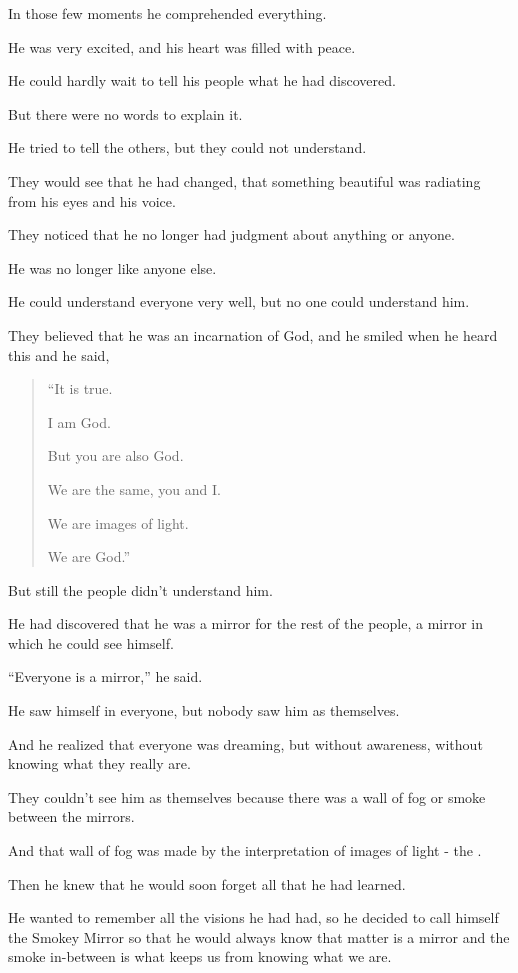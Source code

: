 \documentclass{article}
\numberwithin{equation}{section}
\begin{document}
%
In those few moments he comprehended everything.

He was very excited, and his heart was filled with peace.

He could hardly wait to tell his people what he had discovered.

But there were no words to explain it.

He tried to tell the others, but they could not understand.

They would see that he had changed, that something beautiful was radiating from his eyes and his voice.

They noticed that he no longer had judgment about anything or anyone.

He was no longer like anyone else.

%
He could understand everyone very well, but no one could understand him.

They believed that he was an incarnation of God, and he smiled when he heard this and he said,
\begin{quotation}
    ``It is true.
    
    I am God.
    
    But you are also God.
    
    We are the same, you and I.
    
    We are images of light.
    
    We are God.''
\end{quotation}
But still the people didn't understand him.

%
He had discovered that he was a mirror for the rest of the people, a mirror in which he could see himself.

``Everyone is a mirror,'' he said.

He saw himself in everyone, but nobody saw him as themselves.

And he realized that everyone was dreaming, but without awareness, without knowing what they really are.

They couldn't see him as themselves because there was a wall of fog or smoke between the mirrors.

And that wall of fog was made by the interpretation of images of light - the .

%
Then he knew that he would soon forget all that he had learned.

He wanted to remember all the visions he had had, so he decided to call himself the Smokey Mirror so that he would always know that matter is a mirror and the smoke in-between is what keeps us from knowing what we are.
\end{document}
